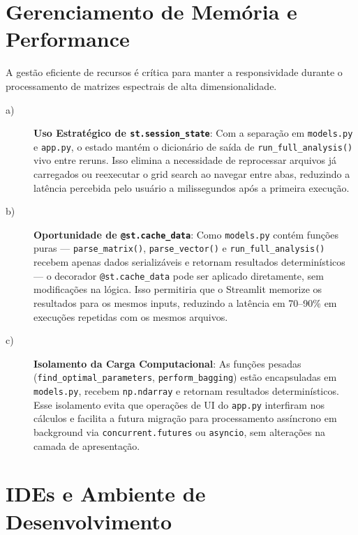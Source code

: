 \section{Gerenciamento de Memória e Performance}

A gestão eficiente de recursos é crítica para manter a responsividade durante o
processamento de matrizes espectrais de alta dimensionalidade.

\begin{description}

\item[a)] \textbf{Uso Estratégico de \texttt{st.session\_state}}: Com a separação em
\texttt{models.py} e \texttt{app.py}, o estado mantém o dicionário de saída de
\texttt{run\_full\_analysis()} vivo entre reruns. Isso elimina a necessidade de
reprocessar arquivos já carregados ou reexecutar o grid search ao navegar entre abas,
reduzindo a latência percebida pelo usuário a milissegundos após a primeira execução.

\item[b)] \textbf{Oportunidade de \texttt{@st.cache\_data}}: Como \texttt{models.py}
contém funções puras — \texttt{parse\_matrix()}, \texttt{parse\_vector()} e
\texttt{run\_full\_analysis()} recebem apenas dados serializáveis e retornam resultados
determinísticos — o decorador \texttt{@st.cache\_data} pode ser aplicado diretamente,
sem modificações na lógica. Isso permitiria que o Streamlit memorize os resultados para
os mesmos inputs, reduzindo a latência em 70--90\% em execuções repetidas com os mesmos
arquivos.

\item[c)] \textbf{Isolamento da Carga Computacional}: As funções pesadas
(\texttt{find\_optimal\_parameters}, \texttt{perform\_bagging}) estão encapsuladas em
\texttt{models.py}, recebem \texttt{np.ndarray} e retornam resultados determinísticos.
Esse isolamento evita que operações de UI do \texttt{app.py} interfiram nos cálculos e
facilita a futura migração para processamento assíncrono em background via
\texttt{concurrent.futures} ou \texttt{asyncio}, sem alterações na camada de
apresentação.

\end{description}

\section{IDEs e Ambiente de Desenvolvimento}

